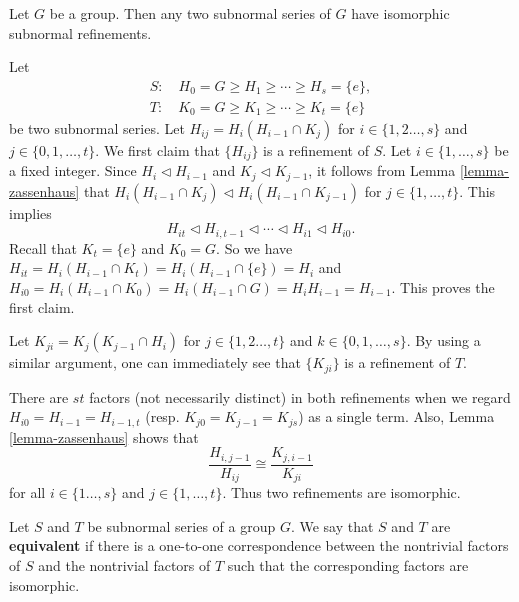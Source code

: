 \begin{theorem} \label{thm-schreier-refinement}
	Let $G$ be a group. Then any two subnormal  series of $G$ have isomorphic subnormal  refinements.
\end{theorem}
\begin{sketch}
	Let \begin{gather*}
		S: \quad H_0 = G \geq H_1 \geq \cdots \geq H_s = \{e\},
		\\
		T: \quad K_0 = G \geq K_1 \geq \cdots \geq K_t = \{e\}
	\end{gather*}
	be two subnormal series. Let $H_{ij} = H_{i} (H_{i-1}\cap K_j)$ for $i\in \{1,2\dots, s\}$ and $j\in\{0,1,\dots, t\}$. We first claim that $\{H_{ij}\}$ is a refinement of $S$. Let $i\in\{1,\dots, s\}$ be a fixed integer. Since $H_{i}\lhd H_{i-1}$ and $K_j \lhd K_{j-1}$, it follows from Lemma \ref{lemma-zassenhaus} that $H_{i} (H_{i-1}\cap K_j) \lhd H_{i} (H_{i-1}\cap K_{j-1})$ for $j\in\{1,\dots, t\}$. This implies
	\begin{equation*}
		H_{it}\lhd H_{i,t-1} \lhd \cdots \lhd H_{i1} \lhd H_{i0}.
	\end{equation*}
	Recall that $K_t = \{e\}$ and $K_0 = G$. So we have $H_{it} = H_i (H_{i-1}\cap K_t) = H_i (H_{i-1}\cap \{e\}) = H_i$ and $H_{i0} = H_i (H_{i-1}\cap K_0) =  H_i (H_{i-1}\cap G) = H_iH_{i-1} = H_{i-1}$. This proves the first claim. 
	
	Let $K_{ji} = K_{j}(K_{j-1}\cap H_i)$ for  $j\in \{1,2\dots, t\}$ and $k\in\{0,1,\dots, s\}$. By using a similar argument, one can immediately see that $\{K_{ji}\}$ is a refinement of $T$. 
	
	There are $st$ factors (not necessarily distinct) in both refinements when we regard $H_{i0} = H_{i-1} = H_{i-1,t}$ (resp. $K_{j0} = K_{j-1} = K_{js}$) as a single term. Also, Lemma \ref{lemma-zassenhaus} shows that
	\begin{equation*}
		\frac{H_{i,j-1}}{H_{ij}} \cong \frac{K_{j,i-1}}{K_{ji}}
	\end{equation*}
	for all $i\in \{1\dots, s\}$ and $j\in \{1,\dots, t\}$. Thus two refinements are isomorphic.
\end{sketch}
\begin{definition} \label{def-equivalent-series}
	Let $S$ and $T$ be subnormal series of a group $G$. We say that $S$ and $T$ are \textbf{equivalent} if 
		there is a one-to-one correspondence between the nontrivial factors of $S$ and
		the nontrivial factors of $T$ such that the corresponding factors are
		isomorphic.
\end{definition}

